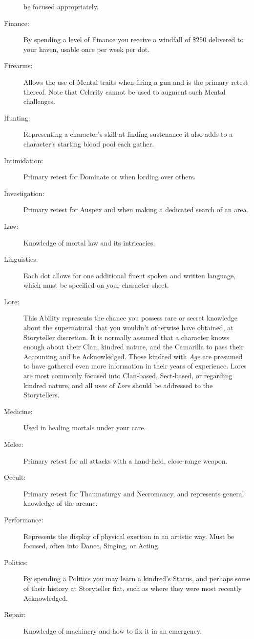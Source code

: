 \begin{description}
	be focused appropriately.
	\item[Finance:]  By spending a level of Finance you receive a windfall of \$250 delivered to your haven, usable 
	once per week per dot.
	\item[Firearms:]  Allows the use of Mental traits when firing a gun and is the primary retest thereof.  Note that Celerity 
	cannot be used to augment such Mental challenges.
	\item[Hunting:]  Representing a character's skill at finding sustenance it also adds to a character's starting 
	blood pool each gather.
	\item[Intimidation:]  Primary retest for Dominate or when lording over others.
	\item[Investigation:]  Primary retest for Auspex and when making a dedicated search of an area.
	\item[Law:]  Knowledge of mortal law and its intricacies.
	\item[Linguistics:]  Each dot allows for one additional fluent spoken and written language, which must be 
	specified on your character sheet.
	\item[Lore:]  This Ability represents the chance you possess rare or secret knowledge about the supernatural 
	that you wouldn't otherwise have obtained, at Storyteller discretion. It is normally assumed that a character 
	knows enough about their Clan, kindred nature, and the Camarilla to pass their Accounting and be Acknowledged.  
	Those kindred with \emph{Age} are presumed to have gathered even more information in their years of experience.  
	Lores are most commonly focused into Clan-based, Sect-based, or regarding kindred nature, and all uses of \emph{Lore} 
	should be addressed to the Storytellers.
	\item[Medicine:]  Used in healing mortals under your care.
	\item[Melee:]  Primary retest for all attacks with a hand-held, close-range weapon.
	\item[Occult:]  Primary retest for Thaumaturgy and Necromancy, and represents general knowledge of the arcane.
	\item[Performance:]  Represents the display of physical exertion in an artistic way.  Must be focused, often 
	into Dance, Singing, or Acting.
	\item[Politics:]  By spending a Politics you may learn a kindred's Status, and perhaps some of their history at Storyteller fiat, such as where they were most recently Acknowledged.
	\item[Repair:]  Knowledge of machinery and how to fix it in an emergency.

\end{description}
